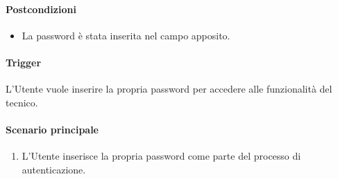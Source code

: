 \paragraph*{Postcondizioni}
\begin{itemize}
  \item La password è stata inserita nel campo apposito.
\end{itemize}

\paragraph*{Trigger}
L'Utente vuole inserire la propria password per accedere alle funzionalità del tecnico.

\paragraph*{Scenario principale}
\begin{enumerate}
  \item L'Utente inserisce la propria password come parte del processo di autenticazione.
\end{enumerate}